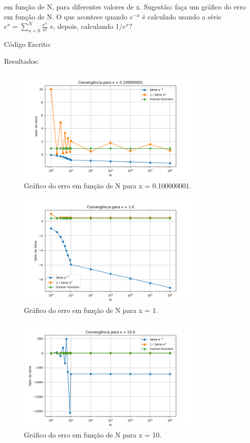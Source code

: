\documentclass[12pt, a4paper]{article} %
\begin{document}
em fun\c{c}\~ao de N, para diferentes valores de x. Sugest\~ao: fa\c{c}a um gr\'afico do erro em fun\c{c}\~ao de N. O que acontece quando $e^{-x}$  \'e calculado usando a s\'erie $e^x = \sum_{n=0}^{N} \frac{x^n}{n!}$ e, depois, calculando 1/$e^x$?

C\'odigo Escrito:


Resultados:
\begin{figure}[H]
    \centering
    \includegraphics[width=0.8\textwidth]{../images/grafico_x_0.100000001.png}
    \caption{Gr\'afico do erro em fun\c{c}\~ao de N para x = 0.100000001.}
\end{figure}

\begin{figure}[H]
    \centering
    \includegraphics[width=0.8\textwidth]{../images/grafico_x_1.0.png}
    \caption{Gr\'afico do erro em fun\c{c}\~ao de N para x = 1.}
\end{figure}

\begin{figure}[H]
    \centering
    \includegraphics[width=0.8\textwidth]{../images/grafico_x_10.0.png}
    \caption{Gr\'afico do erro em fun\c{c}\~ao de N para x = 10.}
\end{figure}
\end{document}
